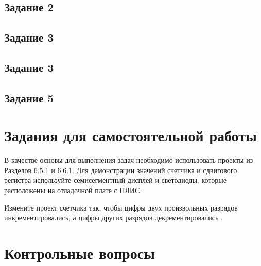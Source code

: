 \documentclass[a4paper,14pt]{article}
\begin{document}
	
	\subsection{Задание 2}
	
	
	\subsection{Задание 3}

	\subsection{Задание 3}
	
	\subsection{Задание 5}
	
	\section{Задания для самостоятельной работы}
	
	В качестве основы для выполнения задач необходимо использовать проекты из
	Разделов 6.5.1 и 6.6.1. Для демонстрации значений счетчика и сдвигового регистра
	используйте семисегментный дисплей и светодиоды, которые расположены на отладочной
	плате с ПЛИС.
	
	Измените проект счетчика так, чтобы цифры двух произвольных разрядов
	инкрементировались, а цифры других разрядов декрементировались .
			
	\section{Контрольные вопросы}
	
\end{document}
